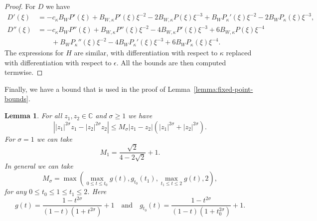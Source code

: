 \documentclass[11pt]{article}
\newtheorem{lemma}[definition]{Lemma}
\begin{document}
\begin{proof}
  For \(D\) we have
  \begin{align*}
    D'(\xi)
    &= -c_{\kappa}B_{W}P'(\xi)
      + B_{W,\kappa}P'(\xi)\xi^{-2}
      - 2B_{W,\kappa}P(\xi)\xi^{-3}
      + B_{W}P_{\kappa}'(\xi)\xi^{-2}
      - 2B_{W}P_{\kappa}(\xi)\xi^{-3},\\
    D''(\xi)
    &= -c_{\kappa}B_{W}P''(\xi)
      + B_{W,\kappa}P''(\xi)\xi^{-2}
      - 4B_{W,\kappa}P'(\xi)\xi^{-3}
      + 6B_{W,\kappa}P(\xi)\xi^{-4}\\
    &\qquad+ B_{W}P_{\kappa}''(\xi)\xi^{-2}
      - 4B_{W}P_{\kappa}'(\xi)\xi^{-3}
      + 6B_{W}P_{\kappa}(\xi)\xi^{-4}.
  \end{align*}
  The expressions for \(H\) are similar, with differentiation with
  respect to \(\kappa\) replaced with differentiation with respect to
  \(\epsilon\). All the bounds are then computed termwise.
\end{proof}

Finally, we have a bound that is used in the proof of
Lemma~\ref{lemma:fixed-point-bounds}.

\begin{lemma}
  For all \(z_1, z_2 \in \mathbb{C}\) and \(\sigma \geq 1\) we have
  \begin{equation*}
    \left||z_{1}|^{2\sigma}z_{1} - |z_{2}|^{2\sigma}z_{2}\right| \leq
    M_\sigma |z_{1} - z_{2}|(|z_{1}|^{2\sigma} + |z_{2}|^{2\sigma}).
  \end{equation*}
  For \(\sigma = 1\) we can take
  \begin{equation*}
    M_{1} = \frac{\sqrt{2}}{4 - 2\sqrt{2}} + 1.
  \end{equation*}
  In general we can take
  \begin{equation*}
    M_{\sigma} = \max\left(
      \max_{0 \leq t \leq t_{0}} g(t),
      g_{t_{0}}(t_{1}),
      \max_{t_{1} \leq t \leq 2} g(t),
      2
    \right),
  \end{equation*}
  for any \(0 \leq t_0 \leq 1 \leq t_1 \leq 2\). Here
  \begin{equation*}
    g(t) = \frac{1 - t^{2\sigma}}{(1 - t)(1 + t^{2\sigma})} + 1
    \quad\text{and}\quad
    g_{t_0}(t) = \frac{1 - t^{2\sigma}}{(1 - t)(1+t_0^{2\sigma})} + 1.
  \end{equation*}
  \label{lemma:M}
\end{lemma}
\end{document}
